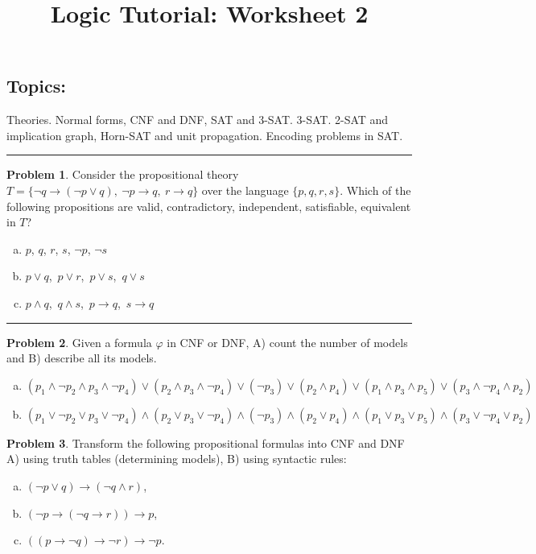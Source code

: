 \documentclass{amsart}
\title{\sc Logic Tutorial: Worksheet 2}
\date{}
\theoremstyle{definition}
\newtheorem{problem}{Problem}
\begin{document}
\maketitle

\subsection*{Topics:} Theories. Normal forms, CNF and DNF, SAT and 3-SAT.  3-SAT. 2-SAT and implication graph, Horn-SAT and unit propagation. Encoding problems in SAT.

\bigskip

\hrule

\bigskip\begin{problem}
Consider the propositional theory $T=\{\neg q \to (\neg p \vee q),\ \neg p \to q,\ r \to q\}$ over the language $\{p, q, r, s\}$. Which of the following propositions are valid, contradictory, independent, satisfiable, equivalent in $T$?
\begin{enumerate}[(a)]
\item $p$, $q$, $r$, $s$, $\neg p$, $\neg s$
\item $p \vee q$,\ $p \vee r$,\ $p \vee s$,\ $q \vee s$
\item $p \wedge q$,\ $q \wedge s$,\ $p \to q$,\ $s \to q$
\end{enumerate}
\end{problem}


\hrule


\bigskip\begin{problem} Given a formula $\varphi$ in CNF or DNF, A) count the number of models and B) describe all its models.
\begin{enumerate}[a)]
\item $(p_1 \wedge  \neg p_2 \wedge  p_3 \wedge  \neg p_4 )\vee(p_2 \wedge  p_3 \wedge  \neg p_4 )\vee(\neg p_3)\vee(p_2 \wedge  p_4)\vee(p_1 \wedge  p_3 \wedge  p_5 )\vee(p_3 \wedge  \neg p_4 \wedge  p_2 )$
\item $(p_1 \vee \neg p_2 \vee p_3 \vee \neg p_4 )\wedge(p_2 \vee p_3 \vee \neg p_4 )\wedge(\neg p_3)\wedge(p_2 \vee p_4)\wedge(p_1 \vee p_3 \vee p_5 )\wedge(p_3 \vee \neg p_4 \vee p_2 )$
\end{enumerate}
\end{problem}


\bigskip\begin{problem} Transform the following propositional formulas into CNF and DNF A) using truth tables (determining models), B) using syntactic rules:
\begin{enumerate}[a)]
    \item $(\neg p \vee q)\to (\neg q \wedge r)$,
    \item $(\neg p \to (\neg q \to r))\to p$,
    \item $((p\to \neg q) \to \neg r) \to \neg p$.
\end{enumerate}
\end{problem}
\end{document}
